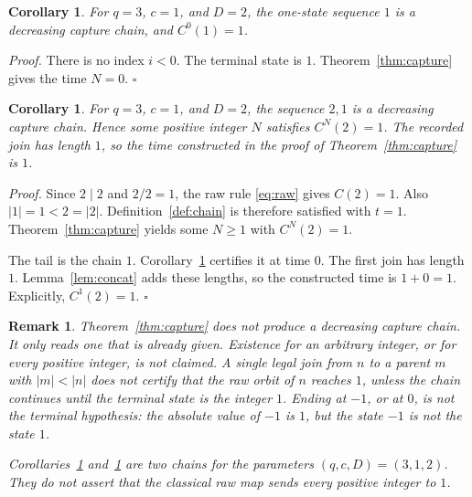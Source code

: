 \documentclass[11pt,letterpaper]{article}
\newtheorem{corollary}[theorem]{Corollary}
\newtheorem{remark}[theorem]{Remark}
\newenvironment{proof}{\noindent\textit{Proof.}}{\hfill\(\square\)}
\begin{document}
\begin{corollary}
\label{cor:one}
For \(q=3\), \(c=1\), and \(D=2\), the one-state sequence \(1\) is a decreasing capture chain, and \(C^{0}(1)=1\).
\end{corollary}

\begin{proof}
There is no index \(i<0\). The terminal state is \(1\). Theorem~\ref{thm:capture} gives the time \(N=0\).
\end{proof}

\begin{corollary}
\label{cor:two}
For \(q=3\), \(c=1\), and \(D=2\), the sequence \(2,1\) is a decreasing capture chain. Hence some positive integer \(N\) satisfies \(C^{N}(2)=1\). The recorded join has length \(1\), so the time constructed in the proof of Theorem~\ref{thm:capture} is \(1\).
\end{corollary}

\begin{proof}
Since \(2\mid 2\) and \(2/2=1\), the raw rule \eqref{eq:raw} gives \(C(2)=1\). Also \(|1|=1<2=|2|\). Definition~\ref{def:chain} is therefore satisfied with \(t=1\). Theorem~\ref{thm:capture} yields some \(N\ge 1\) with \(C^{N}(2)=1\).

The tail is the chain \(1\). Corollary~\ref{cor:one} certifies it at time \(0\). The first join has length \(1\). Lemma~\ref{lem:concat} adds these lengths, so the constructed time is \(1+0=1\). Explicitly, \(C^{1}(2)=1\).
\end{proof}

\begin{remark}
\label{rem:not}
Theorem~\ref{thm:capture} does not produce a decreasing capture chain. It only reads one that is already given. Existence for an arbitrary integer, or for every positive integer, is not claimed. A single legal join from \(n\) to a parent \(m\) with \(|m|<|n|\) does not certify that the raw orbit of \(n\) reaches \(1\), unless the chain continues until the terminal state is the integer \(1\). Ending at \(-1\), or at \(0\), is not the terminal hypothesis: the absolute value of \(-1\) is \(1\), but the state \(-1\) is not the state \(1\).

Corollaries~\ref{cor:one} and~\ref{cor:two} are two chains for the parameters \((q,c,D)=(3,1,2)\). They do not assert that the classical raw map sends every positive integer to \(1\).
\end{remark}
\end{document}
